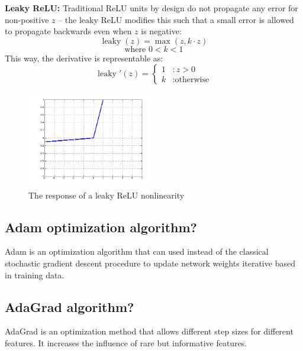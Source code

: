 \textbf{Leaky ReLU:} Traditional ReLU units by design do not propagate any error for non-positive $z$ -- the leaky ReLU modifies this such that a small error is allowed to propagate backwards even when $z$ is negative:
$$\operatorname{leaky}(z) = \operatorname{max}(z, k\cdot z)$$
$$\text{where } 0<k<1$$
This way, the derivative is representable as:
\begin{displaymath}
    \operatorname{leaky}'(z) = \left\{
     \begin{array}{cl}
       1 & : z > 0\\
       k & : \text{otherwise}
     \end{array}
   \right.
\end{displaymath}
\begin{figure}[H]%
  \center%
    \includegraphics[width=0.5\textwidth]{images/eman/graph_leaky.png}
  \caption[The response of a leaky ReLU nonlinearity]{The response of a leaky ReLU nonlinearity}\label{fig:graph_leaky}
\end{figure}
\subsection{Adam optimization algorithm?}
Adam is an optimization algorithm that can used instead of the classical stochastic gradient descent procedure to update network weights iterative based in training data.
\subsection{AdaGrad algorithm?}
AdaGrad is an optimization method that allows different step sizes for different features. It increases the influence of rare but informative features.






